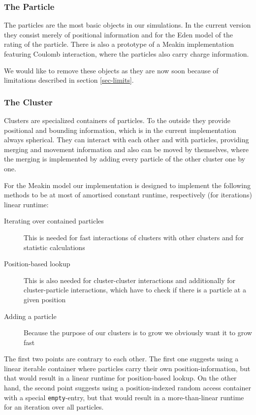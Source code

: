 \documentclass[twocolumn, 10pt]{scrartcl}
\begin{document}
            \subsubsection{The Particle}
                The particles are the most basic objects in our simulations. In the current version they consist merely
                of positional information and for the Eden model of the rating of the particle. There is also a
                prototype of a Meakin implementation featuring Coulomb interaction, where the particles also carry
                charge information.

                We would like to remove these objects as they are now soon because of limitations described in section
                \ref{sec-limits}.

            \subsubsection{The Cluster}
                Clusters are specialized containers of particles. To the outside they provide positional and bounding
                information, which is in the current implementation always spherical. They can interact with each other
                and with particles, providing merging and movement information and also can be moved by themselves,
                where the merging is implemented by adding every particle of the other cluster one by one.
            
                For the Meakin model our implementation is designed to implement the following methods to be at most
                of amortised constant runtime, respectively (for iterations) linear runtime:
                \begin{description}
                    \item[Iterating over contained particles] This is needed for fast interactions of clusters with
                        other clusters and for statistic calculations
                    \item[Position-based lookup] This is also needed for cluster-cluster interactions and additionally
                        for cluster-particle interactions, which have to check if there is a particle at a given
                        position
                    \item[Adding a particle] Because the purpose of our clusters is to grow we obviously want it to grow
                        fast
                \end{description}
                The first two points are contrary to each other. The first one suggests using a linear iterable
                container where particles carry their own position-information, but that would result in a linear
                runtime for position-based lookup. On the other hand, the second point suggests using a position-indexed
                random access container with a special \lstinline'empty'-entry, but that would result in a
                more-than-linear runtime for an iteration over all particles.
\end{document}
